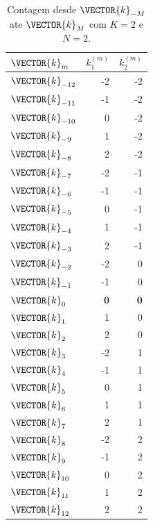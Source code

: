 \noindent
\begin{minipage}{0.45\textwidth}
\begin{table}[H]
\centering
\begin{tabular}{|l||r|r|}
\hline
$\VECTOR{k}_m$     &$k_1^{(m)}$& $k_2^{(m)}$      \\ \hline \hline
$\VECTOR{k}_{-12}$ & -2 & -2 \\ \hline
$\VECTOR{k}_{-11}$ & -1 & -2 \\ \hline
$\VECTOR{k}_{-10}$ &  0 & -2 \\ \hline
$\VECTOR{k}_{-9}$  &  1 & -2 \\ \hline
$\VECTOR{k}_{-8}$  &  2 & -2 \\ \hline \hline
$\VECTOR{k}_{-7}$  & -2 & -1 \\ \hline 
$\VECTOR{k}_{-6}$  & -1 & -1 \\ \hline
$\VECTOR{k}_{-5}$  &  0 & -1 \\ \hline
$\VECTOR{k}_{-4}$  &  1 & -1 \\ \hline
$\VECTOR{k}_{-3}$  &  2 & -1 \\ \hline \hline
$\VECTOR{k}_{-2}$  & -2 &  0 \\ \hline
$\VECTOR{k}_{-1}$  & -1 &  0 \\ \hline
$\VECTOR{k}_{0}$   & $\mathbf{0}$ & $\mathbf{0}$ \\ \hline
$\VECTOR{k}_{1}$   &  1 &  0 \\ \hline
$\VECTOR{k}_{2}$   &  2 &  0 \\ \hline \hline
$\VECTOR{k}_{3}$   & -2 &  1 \\ \hline
$\VECTOR{k}_{4}$   & -1 &  1 \\ \hline
$\VECTOR{k}_{5}$   &  0 &  1 \\ \hline
$\VECTOR{k}_{6}$   &  1 &  1 \\ \hline
$\VECTOR{k}_{7}$   &  2 &  1 \\ \hline \hline
$\VECTOR{k}_{8}$   & -2 &  2 \\ \hline
$\VECTOR{k}_{9}$   & -1 &  2 \\ \hline
$\VECTOR{k}_{10}$  &  0 &  2 \\ \hline
$\VECTOR{k}_{11}$  &  1 &  2 \\ \hline
$\VECTOR{k}_{12}$  &  2 &  2 \\ \hline
\end{tabular}
\caption{Contagem desde $\VECTOR{k}_{-M}$ 
ate $\VECTOR{k}_{M}$ com $K=2$ e $N=2$.}
\label{tab:theo:reglogrnr1fourier:2}
\end{table}
\end{minipage}
